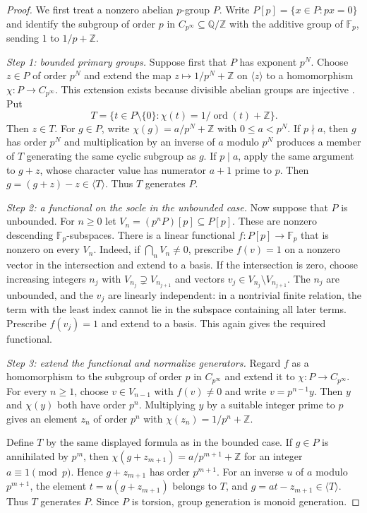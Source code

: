 \documentclass[11pt,reqno]{amsart}
\numberwithin{equation}{section}
\theoremstyle{definition}
\theoremstyle{remark}
\newcommand{\Z}{\mathbb Z}
\newcommand{\Q}{\mathbb Q}
\DeclareMathOperator{\ord}{ord}
\begin{document}
\begin{proof}
We first treat a nonzero abelian $p$-group $P$. Write
$P[p]=\{x\in P:px=0\}$ and identify the subgroup of order $p$ in
$C_{p^\infty}\subseteq\Q/\Z$ with the additive group of
$\mathbb F_p$, sending $1$ to $1/p+\Z$.

\emph{Step 1: bounded primary groups.}
Suppose first that $P$ has exponent $p^N$. Choose $z\in P$ of
order $p^N$ and extend the map
$z\mapsto 1/p^N+\Z$ on $\langle z\rangle$ to a homomorphism
$\chi:P\to C_{p^\infty}$. This extension exists because divisible
abelian groups are injective \cite{Fuchs}. Put
\[
 T=\{t\in P\setminus\{0\}:\chi(t)=1/\ord(t)+\Z\}.
\]
Then $z\in T$. For $g\in P$, write
$\chi(g)=a/p^N+\Z$ with $0\le a<p^N$. If $p\nmid a$, then
$g$ has order $p^N$ and multiplication by an inverse of $a$
modulo $p^N$ produces a member of $T$ generating the same cyclic
subgroup as $g$. If $p\mid a$, apply the same argument to $g+z$,
whose character value has numerator $a+1$ prime to $p$.
Then $g=(g+z)-z\in\langle T\rangle$. Thus $T$ generates $P$.

\emph{Step 2: a functional on the socle in the unbounded case.}
Now suppose that $P$ is unbounded. For $n\ge0$ let
$V_n=(p^nP)[p]\subseteq P[p]$. These are nonzero descending
$\mathbb F_p$-subspaces. There is a linear functional
$f:P[p]\to\mathbb F_p$ that is nonzero on every $V_n$.
Indeed, if $\bigcap_n V_n\ne0$, prescribe $f(v)=1$ on a nonzero
vector in the intersection and extend to a basis. If the intersection
is zero, choose increasing integers $n_j$ with
$V_{n_j}\supsetneq V_{n_{j+1}}$ and vectors
$v_j\in V_{n_j}\setminus V_{n_{j+1}}$. The $n_j$ are unbounded,
and the $v_j$ are linearly independent: in a nontrivial finite
relation, the term with the least index cannot lie in the subspace
containing all later terms. Prescribe $f(v_j)=1$ and extend to a
basis. This again gives the required functional.

\emph{Step 3: extend the functional and normalize generators.}
Regard $f$ as a homomorphism to the subgroup of order $p$ in
$C_{p^\infty}$ and extend it to
$\chi:P\to C_{p^\infty}$. For every $n\ge1$, choose
$v\in V_{n-1}$ with $f(v)\ne0$ and write $v=p^{n-1}y$.
Then $y$ and $\chi(y)$ both have order $p^n$. Multiplying $y$
by a suitable integer prime to $p$ gives an element $z_n$ of
order $p^n$ with $\chi(z_n)=1/p^n+\Z$.

Define $T$ by the same displayed formula as in the bounded case.
If $g\in P$ is annihilated by $p^m$, then
$\chi(g+z_{m+1})=a/p^{m+1}+\Z$ for an integer
$a\equiv1\pmod p$. Hence $g+z_{m+1}$ has order $p^{m+1}$.
For an inverse $u$ of $a$ modulo $p^{m+1}$, the element
$t=u(g+z_{m+1})$ belongs to $T$, and
$g=at-z_{m+1}\in\langle T\rangle$. Thus $T$ generates $P$.
Since $P$ is torsion, group generation is monoid generation.


\end{proof}
\end{document}
